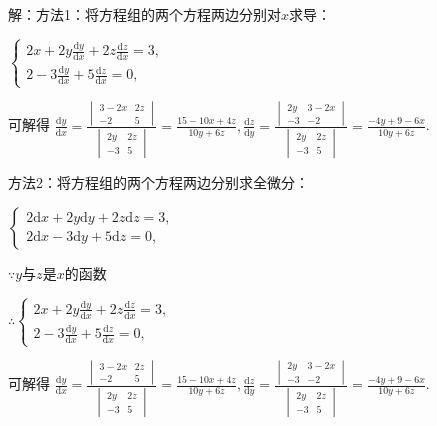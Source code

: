 \documentclass[12pt,UTF8]{ctexart}
\begin{document}
\begin{enumerate}
解：方法1：将方程组的两个方程两边分别对$x$求导：

$\begin{cases}
2x+2y\frac{\mathrm dy}{\mathrm dx}+2z\frac{\mathrm dz}{\mathrm dx}=3,\\
2-3\frac{\mathrm dy}{\mathrm dx}+5\frac{\mathrm dz}{\mathrm dx}=0,
\end{cases}$

可解得
$\frac{\mathrm dy}{\mathrm dx}=\frac{\begin{vmatrix}3-2x&2z\\-2&5\end{vmatrix}}{\begin{vmatrix}2y&2z\\-3&5\end{vmatrix}}=\frac{15-10x+4z}{10y+6z},\frac{\mathrm dz}{\mathrm dy}=\frac{\begin{vmatrix}2y&3-2x\\-3&-2\end{vmatrix}}{\begin{vmatrix}2y&2z\\-3&5\end{vmatrix}}=\frac{-4y+9-6x}{10y+6z}$.

方法2：将方程组的两个方程两边分别求全微分：

$\begin{cases}
2\mathrm dx+2y\mathrm dy+2z\mathrm dz=3,\\
2\mathrm dx-3\mathrm dy+5\mathrm dz=0,
\end{cases}$

$\because y$与$z$是$x$的函数

$\therefore\begin{cases}
2x+2y\frac{\mathrm dy}{\mathrm dx}+2z\frac{\mathrm dz}{\mathrm dx}=3,\\
2-3\frac{\mathrm dy}{\mathrm dx}+5\frac{\mathrm dz}{\mathrm dx}=0,
\end{cases}$

可解得
$\frac{\mathrm dy}{\mathrm dx}=\frac{\begin{vmatrix}3-2x&2z\\-2&5\end{vmatrix}}{\begin{vmatrix}2y&2z\\-3&5\end{vmatrix}}=\frac{15-10x+4z}{10y+6z},\frac{\mathrm dz}{\mathrm dy}=\frac{\begin{vmatrix}2y&3-2x\\-3&-2\end{vmatrix}}{\begin{vmatrix}2y&2z\\-3&5\end{vmatrix}}=\frac{-4y+9-6x}{10y+6z}$.
\end{enumerate}
\end{document}
